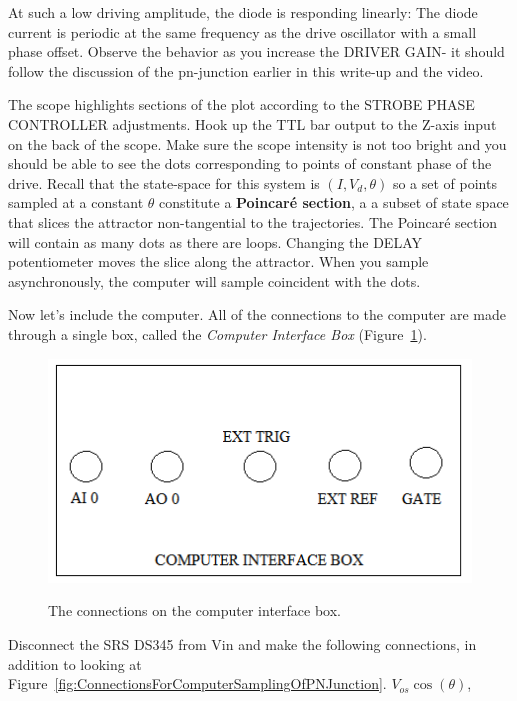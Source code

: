 \documentclass{../lab}
\begin{document}
At such a low driving amplitude, the diode is responding linearly: The diode current is periodic at the same frequency as the drive oscillator with a small phase offset. Observe the behavior as you increase the DRIVER GAIN- it should follow the discussion of the pn-junction earlier in this write-up and the video.

The scope highlights sections of the plot according to the STROBE PHASE CONTROLLER adjustments. Hook up the TTL bar output to the Z-axis input on the back of the scope. Make sure the scope intensity is not too bright and you should be able to see the dots corresponding to points of constant phase of the drive. Recall that the state-space for this system is $(I, V_d,\theta)$ so a set of points sampled at a constant $\theta$ constitute a \textbf{Poincaré section}, a a subset of state space that slices the attractor non-tangential to the trajectories. The Poincaré section will contain as many dots as there are loops. Changing the DELAY potentiometer moves the slice along the attractor. When you sample asynchronously, the computer will sample coincident with the dots.

Now let's include the computer. All of the connections to the computer are made through a single box, called the \emph{Computer Interface Box} (Figure~\ref{fig:ConnectionsOnComputerInterfaceBox}).

\begin{figure}[h]
    \centering
    \href{http://experimentationlab.berkeley.edu/sites/default/files/images/NLD_DAQBOX.png}{\includegraphics[width=0.5\linewidth]{images/NLD_DAQBOX.png}}
    \caption{The connections on the computer interface box.}
    \label{fig:ConnectionsOnComputerInterfaceBox}
\end{figure}

Disconnect the SRS DS345 from Vin and make the following connections, in addition to looking at Figure~\ref{fig:ConnectionsForComputerSamplingOfPNJunction}. $V_{os} \cos(\theta)$,

\newpage
\end{document}
